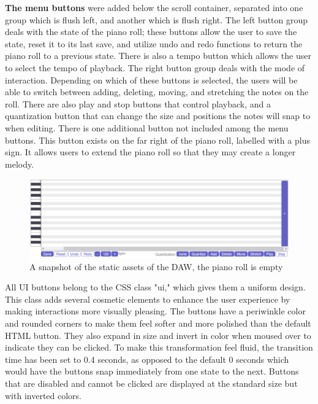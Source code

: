 \textbf{The menu buttons} were added below the scroll container, separated into one group which is flush
left, and another which is flush right. The left button group deals with the state of the piano
roll; these buttons allow the user to save the state, reset it to its last save, and utilize undo and
redo functions to return the piano roll to a previous state. There is also a tempo button which
allows the user to select the tempo of playback. The right button group deals with the mode of
interaction. Depending on which of these buttons is selected, the users will be able to switch
between adding, deleting, moving, and stretching the notes on the roll. There are also play and
stop buttons that control playback, and a quantization button that can change the size and
positions the notes will snap to when editing. There is one additional button not included among
the menu buttons. This button exists on the far right of the piano roll, labelled with a plus sign.
It allows users to extend the piano roll so that they may create a longer melody.

\begin{figure}[h!]
  \centering
  \includegraphics[width=\linewidth]{image/Static.png}
  \caption{A snapshot of the static assets of the DAW, the piano roll is empty}
  \label{fig:static}
\end{figure}

All UI buttons belong to the CSS class "ui," which gives them a uniform design. This class adds
several cosmetic elements to enhance the user experience by making interactions more visually
pleasing. The buttons have a periwinkle color and rounded corners to make them feel softer and
more polished than the default HTML button. They also expand in size and invert in color when
moused over to indicate they can be clicked. To make this transformation feel fluid, the transition
time has been set to 0.4 seconds, as opposed to the default 0 seconds which would have the buttons
snap immediately from one state to the next. Buttons that are disabled and cannot be clicked are
displayed at the standard size but with inverted colors.


